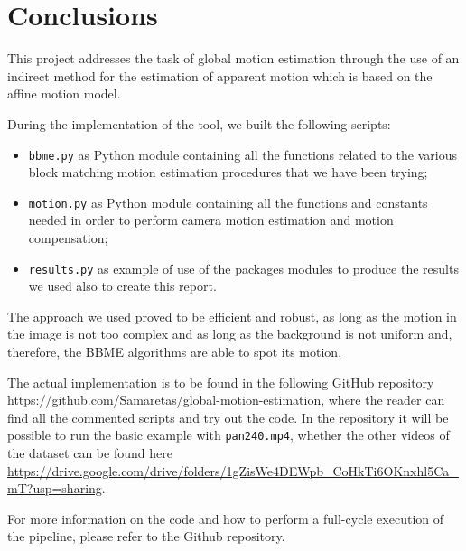 \section{Conclusions}
\label{sec:conclusions}

This project addresses the task of global motion estimation through the use of an indirect method for the estimation of apparent motion which is based on the affine motion model.

During the implementation of the tool, we built the following scripts:
\begin{itemize}
    \item \texttt{bbme.py} as Python module containing all the functions related to the various block matching motion estimation procedures that we have been trying;
    \item \texttt{motion.py} as Python module containing all the functions and constants needed in order to perform camera motion estimation and motion compensation;
    \item \texttt{results.py} as example of use of the packages modules to produce the results we used also to create this report.  
\end{itemize}

The approach we used proved to be efficient and robust, as long as the motion in the image is not too complex and as long as the background is not uniform and, therefore, the BBME algorithms are able to spot its motion.

The actual implementation is to be found in the following GitHub repository \url{https://github.com/Samaretas/global-motion-estimation}, where the reader can find all the commented scripts and try out the code.
In the repository it will be possible to run the basic example with \texttt{pan240.mp4}, whether the other videos of the dataset can be found here \url{https://drive.google.com/drive/folders/1gZisWe4DEWpb_CoHkTi6OKnxhl5Ca_mT?usp=sharing}.

For more information on the code and how to perform a full-cycle execution of the pipeline, please refer to the Github repository.